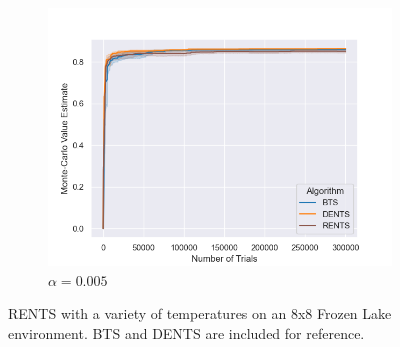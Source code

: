\begin{figure}
\begin{subfigure}[b]{0.32\textwidth}
                    \centering
                    \includegraphics[width=\textwidth]{figures/temp/fl_sens/058_fl8_0_005_02.png}
                    \caption{$\alpha=0.005$}
                \end{subfigure}
                
                \caption{RENTS with a variety of temperatures on an 8x8 Frozen Lake environment. BTS and DENTS are included for reference. }
                \label{fig:fl_param_sens_rents}
            \end{figure}
            
